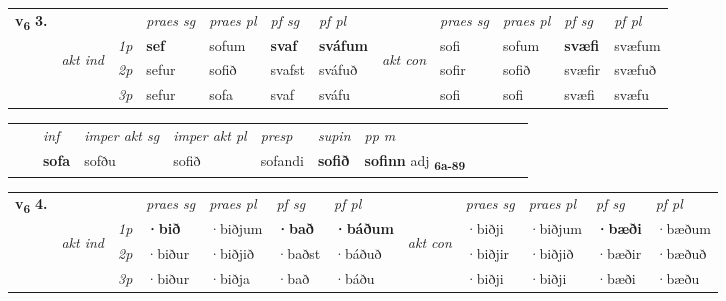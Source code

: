\begin{tabular}{llllllllllll} \toprule
\multirow{4}{*}{{{\textbf{v{\textsubscript{6}}} \Large{\textbf{3.}}}}}  & &   &  \textit{praes sg}  & \textit{praes pl}  &\textit{ pf sg} & \textit{pf pl} &  &  \textit{praes sg}  & \textit{praes pl}  & \textit{pf sg} & \textit{pf pl } \\*
	\cmidrule{4-7} \cmidrule{9-12}
 & \multirow{3}{*}{\begin{turn}{90}\textit{akt ind}\end{turn}} & {\textit{1p}} & \textbf{sef} & sofum    & \textbf{svaf} & \textbf{sváfum} & \multirow{3}{*}{\begin{turn}{90}\textit{akt con}\end{turn}} &sofi & sofum & \textbf{svæfi} & svæfum\\*
& &  {\textit{2p}} &  sefur  & sofið   & svafst & sváfuð & & sofir & sofið & svæfir & svæfuð \\*
& &  {\textit{3p}} & sefur & sofa   & svaf & sváfu & & sofi & sofi& svæfi & svæfu  \\*
\cmidrule{4-7} \cmidrule{9-12}
\end{tabular}


\begin{tabular}{llllllllllll}
 & & \textit{inf} & \textit{imper akt sg} & \textit{imper akt pl}   & \textit{presp} & \textit{supin}  & \textit{pp m}     \\*
  & & \textbf{sofa} & sofðu  & sofið   & sofandi &  \textbf{sofið}  & \textbf{sofinn} adj \textbf{\textsubscript{6a-89}} \\*
\cmidrule{1-12}
\end{tabular}



\begin{tabular}{llllllllllll} \toprule
\multirow{4}{*}{{{\textbf{v{\textsubscript{6}}} \Large{\textbf{4.}}}}}  & &   &  \textit{praes sg}  & \textit{praes pl}  &\textit{ pf sg} & \textit{pf pl} &  &  \textit{praes sg}  & \textit{praes pl}  & \textit{pf sg} & \textit{pf pl } \\*
	\cmidrule{4-7} \cmidrule{9-12}
 & \multirow{3}{*}{\begin{turn}{90}\textit{akt ind}\end{turn}} & {\textit{1p}} & \textbf{·bið} & ·biðjum    & \textbf{·bað} & \textbf{·báðum} & \multirow{3}{*}{\begin{turn}{90}\textit{akt con}\end{turn}} &·biðji & ·biðjum & \textbf{·bæði} & ·bæðum\\*
& &  {\textit{2p}} &  ·biður  & ·biðjið   & ·baðst & ·báðuð & & ·biðjir & ·biðjið & ·bæðir & ·bæðuð \\*
& &  {\textit{3p}} & ·biður & ·biðja   & ·bað & ·báðu & & ·biðji & ·biðji& ·bæði & ·bæðu  \\*
\cmidrule{4-7} \cmidrule{9-12}
\end{tabular}


